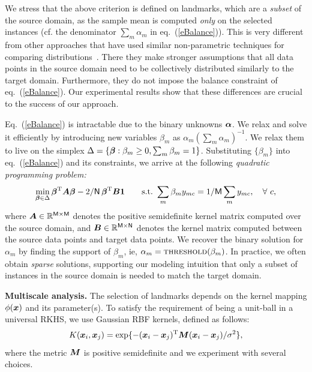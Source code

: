 We stress that the above criterion is defined on landmarks, which are a \emph{subset} of the source domain, as the sample mean is computed \emph{only} on the selected instances (cf. the denominator $\sum_m \alpha_m$ in eq.~(\ref{eBalance})).  This is very different from other approaches that have used similar non-parametric techniques for comparing distributions~\cite{tca,gretton09kmm}. There they  make stronger assumptions that all data points in the source domain need to be collectively distributed similarly to the target domain.  Furthermore, they do not impose the balance constraint of eq.~(\ref{eBalance}).  Our experimental results  show that these differences are crucial to the success of our approach.

Eq.~(\ref{eBalance}) is intractable due to the binary unknowns $\boldsymbol{\alpha}$. We relax and solve it efficiently by introducing new variables $\beta_m$ as $\alpha_m \left(\sum_m \alpha_m\right)^{-1}$.
We relax them to live on the simplex $\Delta=\{\boldsymbol{\beta}: \beta_m \ge 0, \sum_m \beta_m=1\}$. Substituting $\{\beta_m\}$ into eq.~(\ref{eBalance}) and its constraints, we arrive at the following {\em quadratic programming problem:}
\begin{equation}
\min_{\vct{\beta} \in \Delta}  \vct{\beta}\T \mat{A}\vct{\beta} - {2}/{\cst{N}}\, \vct{\beta}\T \mat{B} \vct{1} \qquad
\mathrm{ s.t.\ }   \sum_m \beta_m y_{mc} = {1}/{\cst{M}} \sum_m y_{mc},\ \ \ \forall\ c,
\label{eSelected}
\end{equation}
where $\boldsymbol{A} \in \mathbb{R}^{\mathsf{M}\times\mathsf{M}}$ denotes the positive semidefinite kernel matrix computed over the source domain, and $\boldsymbol{B} \in \mathbb{R}^{\mathsf{M}\times\mathsf{N}}$ denotes the kernel matrix computed between the source data points and target data points. We recover the binary solution for $\alpha_m$ by  finding the support of $\beta_m$, ie, $\alpha_m = \textsc{threshold}(\beta_m)$. In practice, we often obtain \emph{sparse} solutions, supporting our modeling intuition that only a subset of  instances in the source domain is needed to match the target domain.

{\bf Multiscale analysis.} The selection of landmarks depends on the kernel mapping $\phi(\boldsymbol{x})$ and its parameter(s). {To satisfy the requirement of being a unit-ball in a universal RKHS}, we use Gaussian RBF kernels, defined as follows:
\begin{equation} \label{eRBF}
K(\vct{x}_i, \vct{x}_j) = \exp\{  - (\vct{x}_i - \vct{x}_j)\T \mat{M} (\vct{x}_i - \vct{x}_j)/\sigma^2\},
\end{equation}
where the metric $\boldsymbol{M}$ is  positive semidefinite and we experiment with several choices.


